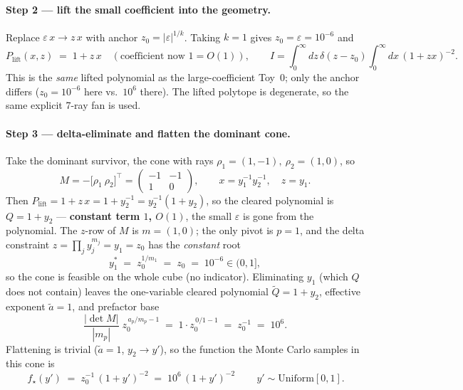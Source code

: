 \documentclass[11pt,a4paper]{article}
\begin{document}
\paragraph{Step 2 --- lift the small coefficient into the geometry.}
Replace $\varepsilon\,x \to z\,x$ with anchor $z_0 = |\varepsilon|^{1/k}$. Taking
$k=1$ gives $z_0 = \varepsilon = 10^{-6}$ and
\begin{equation}
P_{\mathrm{lift}}(x,z) \;=\; 1 + z\,x \quad(\text{coefficient now } 1=O(1)),
\qquad I=\int_0^\infty\! dz\,\delta(z-z_0)\!\int_0^\infty\! dx\,(1+zx)^{-2}.
\end{equation}
This is the \emph{same} lifted polynomial as the large-coefficient Toy~0; only the
anchor differs ($z_0=10^{-6}$ here vs.\ $10^{6}$ there). The lifted polytope is
degenerate, so the same explicit 7-ray fan is used.

\paragraph{Step 3 --- delta-eliminate and flatten the dominant cone.}
Take the dominant survivor, the cone with rays $\rho_1=(1,-1),\ \rho_2=(1,0)$, so
\begin{equation}
M=-\bigl[\rho_1\ \rho_2\bigr]^{\!\top}=\begin{pmatrix}-1&-1\\[1pt]1&0\end{pmatrix},
\qquad x=y_1^{-1}y_2^{-1},\quad z=y_1 .
\end{equation}
Then $P_{\mathrm{lift}} = 1 + z\,x = 1 + y_2^{-1} = y_2^{-1}(1+y_2)$, so the cleared
polynomial is $Q = 1+y_2$ --- \textbf{constant term $1$, $O(1)$}, the small
$\varepsilon$ is gone from the polynomial. The $z$-row of $M$ is $m=(1,0)$; the
only pivot is $p=1$, and the delta constraint $z=\prod_j y_j^{m_j}=y_1 = z_0$ has
the \emph{constant} root
\begin{equation}
y_1^{*} \;=\; z_0^{1/m_1} \;=\; z_0 \;=\; 10^{-6}\in(0,1],
\end{equation}
so the cone is feasible on the whole cube (no indicator). Eliminating $y_1$ (which
$Q$ does not contain) leaves the one-variable cleared polynomial
$\tilde Q = 1+y_2$, effective exponent $\tilde a = 1$, and prefactor base
\begin{equation}
\frac{|\det M|}{|m_p|}\;z_0^{\,a_p/m_p-1}
\;=\; 1\cdot z_0^{\,0/1-1}\;=\;z_0^{-1}\;=\;10^{6}.
\end{equation}
Flattening is trivial ($\tilde a=1$, $y_2\to y'$), so the function the Monte Carlo
samples in this cone is
\begin{equation}\label{eq:lift-good-small}
\boxed{\,f_\star(y') \;=\; z_0^{-1}\,(1+y')^{-2} \;=\; 10^{6}\,(1+y')^{-2}\,}\qquad
y'\sim\mathrm{Uniform}[0,1].
\end{equation}
\end{document}
